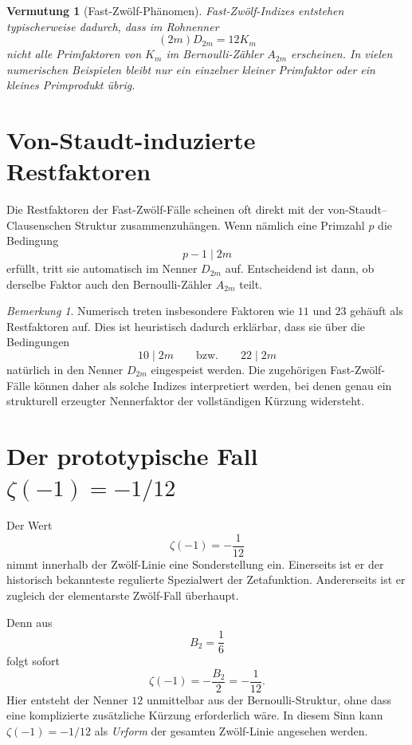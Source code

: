 \documentclass[11pt,a4paper]{article}
\theoremstyle{definition}
\theoremstyle{plain}
\newtheorem{vermutung}[definition]{Vermutung}
\theoremstyle{remark}
\newtheorem{bemerkung}[definition]{Bemerkung}
\begin{document}
	\begin{vermutung}[Fast-Zwölf-Phänomen]
		Fast-Zwölf-Indizes entstehen typischerweise dadurch, dass im Rohnenner
		\[
		(2m)D_{2m}=12K_m
		\]
		nicht alle Primfaktoren von $K_m$ im Bernoulli-Zähler $A_{2m}$ erscheinen. In vielen numerischen Beispielen bleibt nur ein einzelner kleiner Primfaktor oder ein kleines Primprodukt übrig.
	\end{vermutung}
	
	\section{Von-Staudt-induzierte Restfaktoren}
	
	Die Restfaktoren der Fast-Zwölf-Fälle scheinen oft direkt mit der von-Staudt--Clausenschen Struktur zusammenzuhängen. Wenn nämlich eine Primzahl $p$ die Bedingung
	\[
	p-1\mid 2m
	\]
	erfüllt, tritt sie automatisch im Nenner $D_{2m}$ auf. Entscheidend ist dann, ob derselbe Faktor auch den Bernoulli-Zähler $A_{2m}$ teilt.
	
	\begin{bemerkung}
		Numerisch treten insbesondere Faktoren wie $11$ und $23$ gehäuft als Restfaktoren auf. Dies ist heuristisch dadurch erklärbar, dass sie über die Bedingungen
		\[
		10\mid 2m \qquad\text{bzw.}\qquad 22\mid 2m
		\]
		natürlich in den Nenner $D_{2m}$ eingespeist werden. Die zugehörigen Fast-Zwölf-Fälle können daher als solche Indizes interpretiert werden, bei denen genau ein strukturell erzeugter Nennerfaktor der vollständigen Kürzung widersteht.
	\end{bemerkung}
	
	\section{Der prototypische Fall \texorpdfstring{$\zeta(-1)=-1/12$}{zeta(-1)=-1/12}}
	
	Der Wert
	\[
	\zeta(-1)=-\frac{1}{12}
	\]
	nimmt innerhalb der Zwölf-Linie eine Sonderstellung ein. Einerseits ist er der historisch bekannteste regulierte Spezialwert der Zetafunktion. Andererseits ist er zugleich der elementarste Zwölf-Fall überhaupt.
	
	Denn aus
	\[
	B_2=\frac16
	\]
	folgt sofort
	\[
	\zeta(-1)=-\frac{B_2}{2}=-\frac{1}{12}.
	\]
	Hier entsteht der Nenner $12$ unmittelbar aus der Bernoulli-Struktur, ohne dass eine komplizierte zusätzliche Kürzung erforderlich wäre. In diesem Sinn kann $\zeta(-1)=-1/12$ als \emph{Urform} der gesamten Zwölf-Linie angesehen werden.
	
\end{document}
